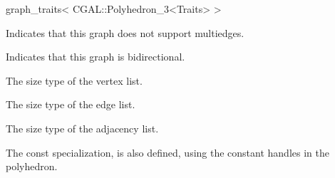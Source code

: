 \begin{ccRefClass}{graph_traits< CGAL::Polyhedron_3<Traits> >}
  
  {Indicates that this graph does not support multiedges.}
  
    {Indicates that this graph is bidirectional.}
    
    {The size type of the vertex list.}
    
    {The size type of the edge list.}
    
    {The size type of the adjacency list.}

The const specialization,  
is also defined, using the constant handles in the polyhedron.
     
\end{ccRefClass}
